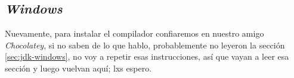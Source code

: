 \subsection{\textit{Windows}}
  Nuevamente, para instalar el compilador confiaremos en nuestro amigo 
  \textit{Chocolatey}, si no saben de lo que hablo, probablemente no leyeron la
  sección \ref{sec:jdk-windows}, no voy a repetir esas instrucciones, así que vayan a leer esa
  sección y luego vuelvan aquí; lxs espero.